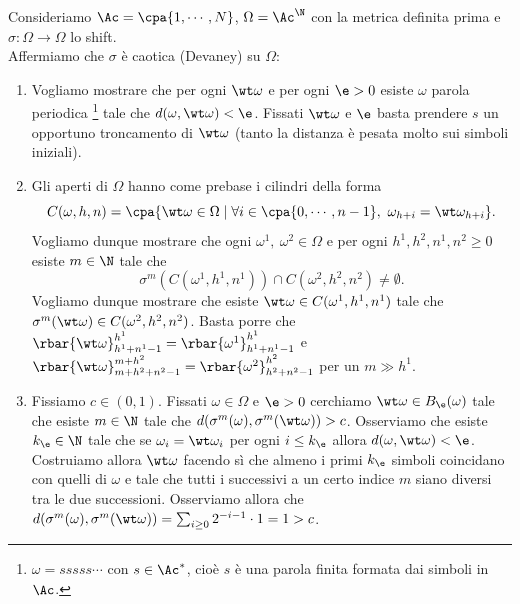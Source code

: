 \begin{example}
Consideriamo $\Ac=\cpa{1,\cdots, N}$, $\Omega=\Ac^\N$ con la metrica definita prima e $\sigma:\Omega\to\Omega$ lo shift.\\
Affermiamo che $\sigma$ \`e caotica (Devaney) su $\Omega$:
\begin{enumerate}
\item Vogliamo mostrare che per ogni $\wt \omega$ e per ogni $\e>0$ esiste $\omega$ parola periodica \footnote{$\omega=sssss\cdots$ con $s\in \Ac^\ast$, cio\`e $s$ \`e una parola finita formata dai simboli in $\Ac$.} tale che $d(\omega,\wt \omega)<\e$. Fissati $\wt \omega$ e $\e$ basta prendere $s$ un opportuno troncamento di $\wt \omega$ (tanto la distanza \`e pesata molto sui simboli iniziali).
\item Gli aperti di $\Omega$ hanno come prebase i cilindri della forma
\[C(\omega,h,n)=\cpa{\wt \omega\in\Omega\mid \forall i\in\cpa{0,\cdots,n-1},\ \omega_{h+i}=\wt \omega_{h+i}}.\]
Vogliamo dunque mostrare che ogni $\omega^1,\ \omega^2\in\Omega$ e per ogni $h^1,h^2,n^1,n^2\geq 0$ esiste $m\in\N$ tale che
\[\sigma^m(C(\omega^1,h^1,n^1))\cap C(\omega^2,h^2,n^2)\neq \emptyset.\]
Vogliamo dunque mostrare che esiste $\wt \omega\in C(\omega^1,h^1,n^1)$ tale che $\sigma^m(\wt \omega)\in C(\omega^2,h^2,n^2)$. Basta porre che $\rbar{\wt\omega}_{h^1+n^1-1}^{h^1}=\rbar{\omega^1}_{h^1+n^1-1}^{h^1}$ e $\rbar{\wt\omega}_{m+h^2+n^2-1}^{m+h^2}=\rbar{\omega^2}_{h^2+n^2-1}^{h^2}$ per un $m\gg h^1$.
\item Fissiamo $c\in (0,1)$. Fissati $\omega\in\Omega$ e $\e>0$ cerchiamo $\wt \omega\in B_\e(\omega)$ tale che esiste $m\in\N$ tale che $d(\sigma^m(\omega),\sigma^m(\wt \omega))>c$. Osserviamo che esiste $k_\e\in\N$ tale che se $\omega_i=\wt \omega_i$ per ogni $i\leq k_\e$ allora $d(\omega,\wt \omega)<\e$. Costruiamo allora $\wt \omega$ facendo s\`i che almeno i primi $k_\e$ simboli coincidano con quelli di $\omega$ e tale che tutti i successivi a un certo indice $m$ siano diversi tra le due successioni. Osserviamo allora che $d(\sigma^m(\omega),\sigma^m(\wt \omega))=\sum_{i\geq 0}2^{-i-1}\cdot 1=1>c$.
\end{enumerate}
\end{example}

